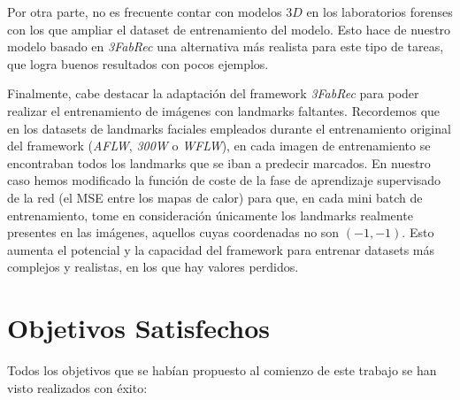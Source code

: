 \noindent Por otra parte, no es frecuente contar con modelos $3D$ en los laboratorios forenses con los que ampliar el dataset de entrenamiento del modelo. Esto hace de nuestro modelo basado en \textit{3FabRec} una alternativa más realista para este tipo de tareas, que logra buenos resultados con pocos ejemplos.

\medskip

\noindent Finalmente, cabe destacar la adaptación del framework \textit{3FabRec} para poder realizar el entrenamiento de imágenes con landmarks faltantes. Recordemos que en los datasets de landmarks faciales empleados durante el entrenamiento original del framework (\textit{AFLW}, \textit{300W} o \textit{WFLW}), en cada imagen de entrenamiento se encontraban todos los landmarks que se iban a predecir marcados. En nuestro caso hemos modificado la función de coste de la fase de aprendizaje supervisado de la red (el MSE entre los mapas de calor) para que, en cada mini batch de entrenamiento, tome en consideración únicamente los landmarks realmente presentes en las imágenes, aquellos cuyas coordenadas no son $(-1,-1)$. Esto aumenta el potencial y la capacidad del framework para entrenar datasets más complejos y realistas, en los que hay valores perdidos.

\section{Objetivos Satisfechos}

Todos los objetivos que se habían propuesto al comienzo de este trabajo se han visto realizados con éxito:

